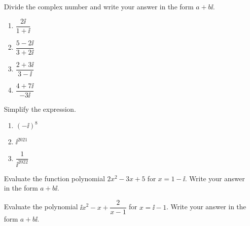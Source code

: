 \begin{exercise}
  Divide the complex number and write your answer in the form \(a+b\ii\).
  
  \begin{enumerate}
  \item
    \(\dfrac{2\ii}{1+\ii}\)
  \item
    \(\dfrac{5-2\ii}{3+2\ii}\)
  \item
    \(\dfrac{2+3\ii}{3-\ii}\)
  \item
    \(\dfrac{4+7\ii}{-3\ii}\)
  \end{enumerate}
\end{exercise}

\begin{exercise}
  Simplify the expression.
  
  \begin{enumerate}
  \item
    \((-\ii)^{8}\)
  \item
    \(\ii^{2021}\)
  \item
    \(\dfrac1{\ii^{2022}}\)
  \end{enumerate}
\end{exercise}

\begin{exercise}
  Evaluate the function polynomial \(2x^2-3x+5\) for \(x=1-\ii\). Write
  your answer in the form \(a+b\ii\).
\end{exercise}
\vspace*{5\baselineskip}

\begin{exercise}
  Evaluate the polynomial \(\ii x^2-x+\dfrac{2}{x-1}\) for \(x=\ii-1\).
  Write your answer in the form \(a+b\ii\).
\end{exercise}

